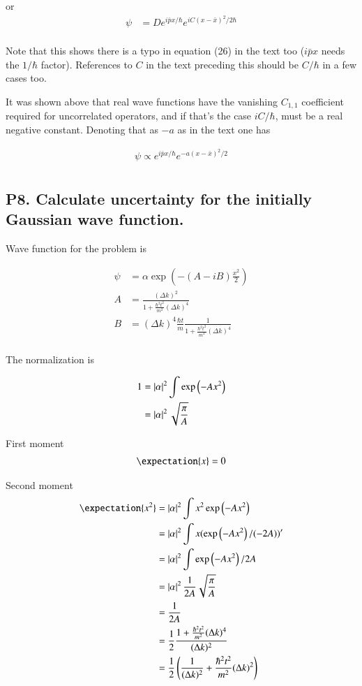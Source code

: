 or
\begin{align*}
\psi &= D e^{i\bar{p} x/\hbar} e^{ i C (x - \bar{x})^2/2\hbar } \\
\end{align*}

Note that this shows there is a typo in equation (26) in the text too ($i\bar{p} x$ needs the $1/\hbar$ factor).  References to $C$ in the text preceding this should be $C/\hbar$ in a few cases too.

It was shown above that real wave functions have the vanishing $C_{1,1}$ coefficient required for uncorrelated operators, and if that's the case $i C/\hbar$, must be a real negative constant.  Denoting that as $-a$ as in the text one has

\begin{align*}
\psi \propto e^{i\bar{p} x/\hbar} e^{ -a(x - \bar{x})^2/2} \\
\end{align*}

\subsection{P8. Calculate uncertainty for the initially Gaussian wave function. }

Wave function for the problem is

\begin{align*}
\psi &= \alpha \exp\left( -(A - iB) \frac{x^2}{2} \right) \\
A &= \frac{(\Delta k)^2}{ 1 + \frac{\hbar^2 t^2}{m^2}(\Delta k)^4 } \\
B &= (\Delta k)^4 \frac{\hbar t}{m} \frac{1}{ 1 + \frac{\hbar^2 t^2}{m^2}(\Delta k)^4 } \\
\end{align*}

The normalization is

\begin{align*}
1 
&= \left\lvert{\alpha}\right\rvert^2 \int \exp\left( -A {x^2} \right) \\
&= \left\lvert{\alpha}\right\rvert^2 \sqrt{\frac{\pi}{A}}
\end{align*}

First moment
\begin{align*}
\expectation{x} = 0
\end{align*}

Second moment
\begin{align*}
\expectation{x^2} 
&= 
\Abs{\alpha}^2 \int x^2 \exp\left( -A x^2 \right) \\
&= 
\Abs{\alpha}^2 \int x (\exp\left( -A x^2 \right)/(-2A))' \\
&= 
\Abs{\alpha}^2 \int \exp\left( -A x^2 \right)/2A \\
&= 
\Abs{\alpha}^2 \inv{2A} \sqrt{ \frac{\pi}{A}} \\
&= 
\inv{2A} \\
&=
\inv{2} \frac{ 1 + \frac{\hbar^2 t^2}{m^2}(\Delta k)^4 }{(\Delta k)^2}
 \\
&=
\inv{2}\left(\inv{(\Delta k)^2} + \frac{\hbar^2 t^2}{m^2}(\Delta k)^2 \right) \\
\end{align*}

